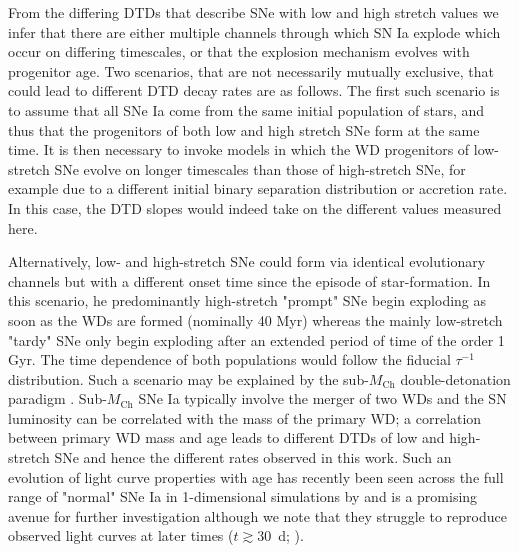 \documentclass[fleqn,usenatbib]{mnras}
\begin{document}
From the differing DTDs that describe SNe with low and high stretch values we infer that there are either multiple channels through which SN Ia explode which occur on differing timescales, or that the explosion mechanism evolves with progenitor age. Two scenarios, that are not necessarily mutually exclusive, that could lead to different DTD decay rates are as follows. 
The first such scenario is to assume that all SNe Ia come from the same initial population of stars, and thus that the progenitors of both low and high stretch SNe form at the same time. It is then necessary to invoke models in which the WD progenitors of low-stretch SNe evolve on longer timescales than those of high-stretch SNe, for example due to a different initial binary separation distribution or accretion rate. In this case, the DTD slopes would indeed take on the different values measured here.

Alternatively, low- and high-stretch SNe could form via identical evolutionary channels but with a different onset time since the episode of star-formation. In this scenario, he predominantly high-stretch "prompt" SNe begin exploding as soon as the WDs are formed (nominally 40 Myr) whereas the mainly low-stretch "tardy" SNe only begin exploding after an extended period of time of the order 1 Gyr. The time dependence of both populations would follow the fiducial $\tau^{-1}$ distribution.
Such a scenario may be explained by the sub-$M_{\mathrm{Ch}}$ double-detonation paradigm \citep[e.g.][]{Sim2010,Blondin2017,Shen2017}. Sub-$M_{\mathrm{Ch}}$ SNe Ia typically involve the merger of two WDs and the SN luminosity can be correlated with the mass of the primary WD; a correlation between primary WD mass and age leads to different DTDs of low and high-stretch SNe and hence the different rates observed in this work. Such an evolution of light curve properties with age has recently been seen across the full range of "normal" SNe Ia in 1-dimensional simulations by \citet{Shen2021} and is a promising avenue for further investigation although we note that they struggle to reproduce observed light curves at later times ($t\gtrsim30$~d; \citealt{Shen2021,Gronow2021}).
\end{document}
